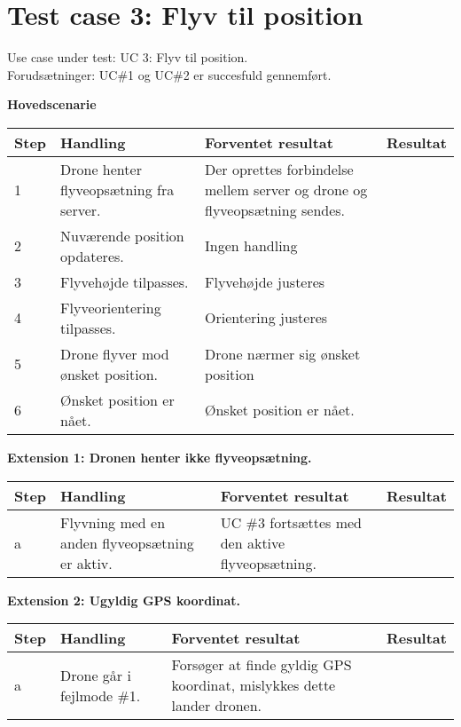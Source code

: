 \newpage

\section{Test case 3: Flyv til position}
Use case under test: UC 3: Flyv til position.\\
Forudsætninger:	UC\#1 og UC\#2 er succesfuld gennemført.

\textbf{Hovedscenarie}
\begin{table}[H]
	\centering
		\begin{tabular}{|l|p{5 cm}|p{5 cm}|p{3.5 cm}|} 
		\hline
			Step & Handling & Forventet resultat & Resultat\\ \hline
			1 & Drone henter flyveopsætning fra server. & Der oprettes forbindelse \newline mellem server og drone \newline og flyveopsætning sendes. & \\ \hline
			2 & Nuværende position \newline opdateres. & Ingen handling  &  \\ \hline
			3 & Flyvehøjde tilpasses. & Flyvehøjde justeres &  \\ \hline
			4 & Flyveorientering tilpasses. & Orientering justeres &  \\ \hline
			5 & Drone flyver mod \newline ønsket position. & Drone nærmer sig \newline ønsket position  &  \\ \hline
			6 & Ønsket position er nået. & Ønsket position er nået. \\ \hline
		\end{tabular}
\end{table}

\textbf{Extension 1: Dronen henter ikke flyveopsætning.}
\begin{table}[H]
	\centering
		\begin{tabular}{|l|p{5 cm}|p{5 cm}|p{3.5 cm}|} 
		\hline
			Step & Handling & Forventet resultat & Resultat\\ \hline
			a & Flyvning med en anden flyveopsætning er aktiv. & UC \#3 fortsættes med den aktive flyveopsætning. & \\ \hline
		\end{tabular}
\end{table}

\textbf{Extension 2: Ugyldig GPS koordinat.}
\begin{table}[H]
	\centering
		\begin{tabular}{|l|p{5 cm}|p{5 cm}|p{3.5 cm}|} 
		\hline
			Step & Handling & Forventet resultat & Resultat\\ \hline
			a & Drone går i fejlmode \#1. & Forsøger at finde gyldig GPS koordinat, mislykkes dette lander dronen. & \\ \hline
		\end{tabular}
\end{table}

